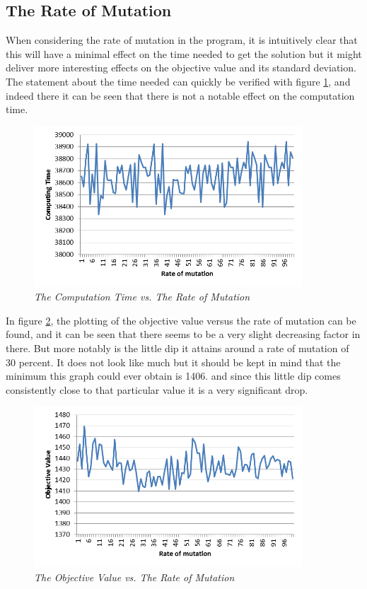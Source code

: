 \subsection{The Rate of Mutation}
When considering the rate of mutation in the program, it is intuitively clear that this will have a minimal effect on the time needed to get the solution but it might deliver more interesting effects on the objective value and its standard deviation.
The statement about the time needed can quickly be verified with figure \ref{CTRM}, and indeed there it can be seen that there is not a notable effect on the computation time.

\begin{figure}[h] 
	\centering
	\includegraphics[height=6cm]{CTRM}
	\caption{\textsl{The Computation Time vs. The Rate of Mutation}}
	\label{CTRM}
\end{figure}


\par
In figure \ref{OVRM}, the plotting of the objective value versus the rate of mutation can be found, and it can be seen that there seems to be a very slight decreasing factor in there. But more notably is the little dip it attains around a rate of mutation of 30 percent. It does not look like much but it should be kept in mind that the minimum this graph could ever obtain is 1406. and since this little dip comes consistently close to that particular value it is a very significant drop.

\begin{figure}[h] 
	\centering
	\includegraphics[height=6cm]{OVRM}
	\caption{\textsl{The Objective Value vs. The Rate of Mutation}}
	\label{OVRM}
\end{figure}

